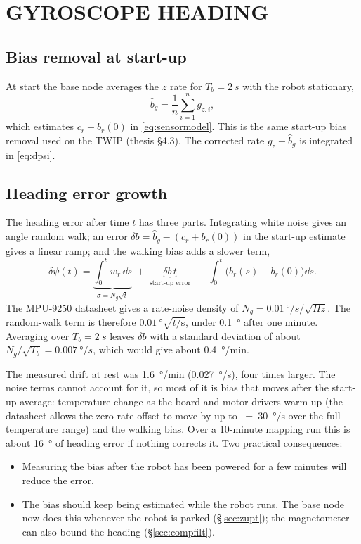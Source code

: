 \section{GYROSCOPE HEADING}
\label{sec:gyro}

\subsection{Bias removal at start-up}

At start the base node averages the $z$ rate for $T_b=\SI{2}{s}$ with the
robot stationary,
\begin{equation}\label{eq:gyrobias}
\hat b_g = \frac{1}{n}\sum_{i=1}^{n} g_{z,i},
\end{equation}
which estimates $c_r+b_r(0)$ in \eqref{eq:sensormodel}. This is the same
start-up bias removal used on the TWIP (thesis \S4.3). The corrected rate
$g_z-\hat b_g$ is integrated in \eqref{eq:dpsi}.

\subsection{Heading error growth}

The heading error after time $t$ has three parts. Integrating white noise
gives an angle random walk; an error $\delta b=\hat b_g-(c_r+b_r(0))$ in the
start-up estimate gives a linear ramp; and the walking bias adds a slower
term,
\begin{equation}\label{eq:headingerr}
\delta\psi(t) = \underbrace{\int_0^t w_r\,\dd s}_{\sigma=N_g\sqrt t}
\;+\;\underbrace{\delta b\,t}_{\text{start-up error}}
\;+\;\int_0^t\bigl(b_r(s)-b_r(0)\bigr)\dd s .
\end{equation}
The MPU-9250 datasheet gives a rate-noise density of
$N_g=\SI{0.01}{\degree/s/\sqrt{Hz}}$. The random-walk term is therefore
$\SI{0.01}{\degree}\sqrt{t/\mathrm{s}}$, under \SI{0.1}{\degree} after one
minute. Averaging over $T_b=\SI{2}{s}$ leaves $\delta b$ with a standard
deviation of about $N_g/\sqrt{T_b}=\SI{0.007}{\degree/s}$, which would give
about \SI{0.4}{\degree/min}.

The measured drift at rest was \SI{1.6}{\degree/min}
(\SI{0.027}{\degree/s}), four times larger. The noise terms cannot account
for it, so most of it is bias that moves after the start-up average:
temperature change as the board and motor drivers warm up (the datasheet
allows the zero-rate offset to move by up to \SI{\pm30}{\degree/s} over the
full temperature range) and the walking bias. Over a 10-minute mapping run
this is about \SI{16}{\degree} of heading error if nothing corrects it. Two
practical consequences:
\begin{itemize}
\item Measuring the bias after the robot has been powered for a few minutes
  will reduce the error.
\item The bias should keep being estimated while the robot runs. The base
  node now does this whenever the robot is parked (\S\ref{sec:zupt}); the
  magnetometer can also bound the heading (\S\ref{sec:compfilt}).
\end{itemize}

